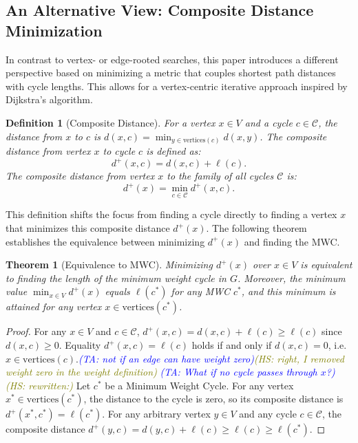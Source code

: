 \documentclass{article}
\newtheorem{theorem}{Theorem}
\newtheorem{definition}{Definition}
\newcommand{\ta}[1]{\textcolor{blue}{\textit{(TA: {#1})}}}
\newcommand{\hs}[1]{\textcolor{olive}{\textit{(HS: {#1})}}}
\begin{document}
\subsection{An Alternative View: Composite Distance Minimization}
\label{subsec:composite_distance} %

In contrast to vertex- or edge-rooted searches, this paper introduces a different perspective based on minimizing a metric that couples shortest path distances with cycle lengths. This allows for a vertex-centric iterative approach inspired by Dijkstra's algorithm.

\begin{definition}[Composite Distance]\label{def:composite_distance}
For a vertex $x \in V$ and a cycle $c \in \mathscr{C}$, the distance from $x$ to $c$ is $d(x,c) = \min_{y \in \text{vertices}(c)} d(x,y)$. The \textit{composite distance} from vertex $x$ to cycle $c$ is defined as:
\begin{equation}\label{eq:composite}
d^+(x,c) = d(x,c) + \ell(c).
\end{equation}
The composite distance from vertex $x$ to the family of all cycles $\mathscr{C}$ is:
\begin{equation}\label{eq:closestC}
d^+(x) = \min_{c\in \mathscr{C}} d^+(x,c).
\end{equation}
\end{definition}

This definition shifts the focus from finding a cycle directly to finding a vertex $x$ that minimizes this composite distance $d^+(x)$. The following theorem establishes the equivalence between minimizing $d^+(x)$ and finding the MWC.

\begin{theorem}[Equivalence to MWC]\label{thm:minmin_equiv} %
	Minimizing $d^+(x)$ over $x\in V$ is equivalent to finding the length of the minimum weight cycle in $G$. Moreover, the minimum value $\min_{x \in V} d^+(x)$ equals $\ell(c^*)$ for any MWC $c^*$, and this minimum is attained for any vertex $x \in \text{vertices}(c^*)$.
\end{theorem}
\begin{proof}
	For any $x\in V$ and $c\in \mathscr{C}$, $d^+(x,c) = d(x,c) + \ell(c) \ge \ell(c)$ since $d(x,c) \ge 0$. Equality $d^+(x,c) = \ell(c)$ holds if and only if $d(x,c) = 0$, i.e. $x \in \text{vertices}(c)$.\ta{not if an edge can have weight zero}\hs{right, I removed weight zero in the weight definition} 
    \ta{What if no cycle passes through $x$?}\hs{rewritten:} Let $c^*$ be a Minimum Weight Cycle. For any vertex $x^* \in \text{vertices}(c^*)$, the distance to the cycle is zero, so its composite distance is $d^+(x^*, c^*) = \ell(c^*)$. For any arbitrary vertex $y \in V$ and any cycle $c \in \mathscr{C}$, the composite distance $d^+(y,c) = d(y,c) + \ell(c) \ge \ell(c) \ge \ell(c^*)$.
\end{proof}
\end{document}
